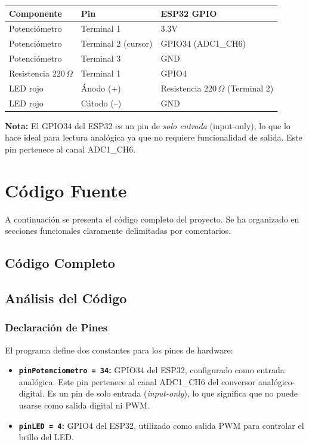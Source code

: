 \documentclass[12pt,a4paper]{article}
\begin{document}
\begin{center}
\begin{tabular}{lll}
\toprule
\textbf{Componente} & \textbf{Pin} & \textbf{ESP32 GPIO} \\
\midrule
Potenciómetro & Terminal 1 & 3.3V \\
Potenciómetro & Terminal 2 (cursor) & GPIO34 (ADC1\_CH6) \\
Potenciómetro & Terminal 3 & GND \\
Resistencia 220\,$\Omega$ & Terminal 1 & GPIO4 \\
LED rojo & Ánodo (+) & Resistencia 220\,$\Omega$ (Terminal 2) \\
LED rojo & Cátodo (--) & GND \\
\bottomrule
\end{tabular}
\end{center}

\textbf{Nota:} El GPIO34 del ESP32 es un pin de \textit{solo entrada} (input-only), lo que lo hace ideal para lectura analógica ya que no requiere funcionalidad de salida. Este pin pertenece al canal ADC1\_CH6.

\section{Código Fuente}

A continuación se presenta el código completo del proyecto. Se ha organizado en secciones funcionales claramente delimitadas por comentarios.

\subsection{Código Completo}


\subsection{Análisis del Código}

\subsubsection*{Declaración de Pines}
El programa define dos constantes para los pines de hardware:
\begin{itemize}
    \item \textbf{\texttt{pinPotenciometro = 34}:} GPIO34 del ESP32, configurado como entrada analógica. Este pin pertenece al canal ADC1\_CH6 del conversor analógico-digital. Es un pin de solo entrada (\textit{input-only}), lo que significa que no puede usarse como salida digital ni PWM.
    \item \textbf{\texttt{pinLED = 4}:} GPIO4 del ESP32, utilizado como salida PWM para controlar el brillo del LED.
\end{itemize}
\end{document}
